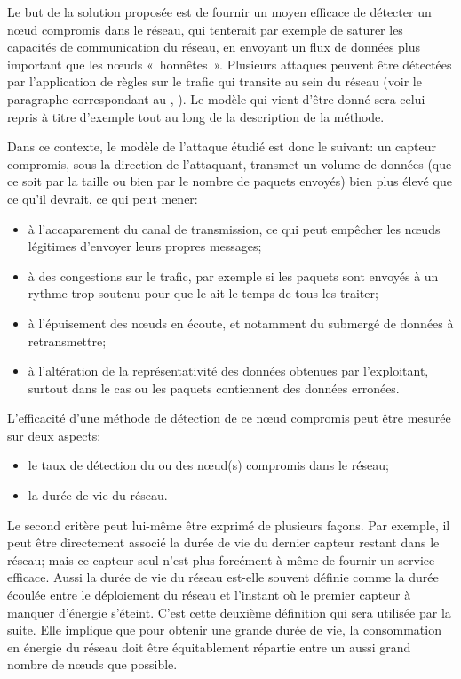 Le but de la solution proposée est de fournir un moyen efficace de détecter un nœud compromis dans le réseau, qui tenterait par exemple de saturer les capacités de communication du réseau, en envoyant un flux de données plus important que les nœuds «~honnêtes~».
Plusieurs attaques peuvent être détectées par l'application de règles sur le trafic qui transite au sein du réseau (voir le paragraphe correspondant au , ).
Le modèle qui vient d'être donné sera celui repris à titre d'exemple tout au long de la description de la méthode.

Dans ce contexte, le modèle de l'attaque étudié est donc le suivant: un capteur compromis, sous la direction de l'attaquant, transmet un volume de données (que ce soit par la taille ou bien par le nombre de paquets envoyés) bien plus élevé que ce qu'il devrait, ce qui peut mener:
\begin{itemize}
    \item à l'accaparement du canal de transmission, ce qui peut empêcher les nœuds légitimes d'envoyer leurs propres messages;
    \item à des congestions sur le trafic, par exemple si les paquets sont envoyés à un rythme trop soutenu pour que le \CH ait le temps de tous les traiter;
    \item à l'épuisement des nœuds en écoute, et notamment du \ch submergé de données à retransmettre;
    \item à l'altération de la représentativité des données obtenues par l'exploitant, surtout dans le cas ou les paquets contiennent des données erronées.
\end{itemize}

L'efficacité d'une méthode de détection de ce nœud compromis peut être mesurée sur deux aspects:
\begin{itemize}
    \item le taux de détection du ou des nœud(s) compromis dans le réseau;
    \item la durée de vie du réseau.
\end{itemize}
Le second critère peut lui-même être exprimé de plusieurs façons.
Par exemple, il peut être directement associé la durée de vie du dernier capteur restant dans le réseau; mais ce capteur seul n'est plus forcément à même de fournir un service efficace.
Aussi la durée de vie du réseau est-elle souvent définie comme la durée écoulée entre le déploiement du réseau et l'instant où le premier capteur à manquer d'énergie s'éteint.
C'est cette deuxième définition qui sera utilisée par la suite.
Elle implique que pour obtenir une grande durée de vie, la consommation en énergie du réseau doit être équitablement répartie entre un aussi grand nombre de nœuds que possible.

